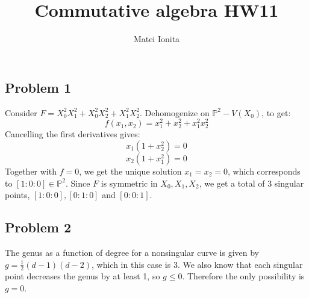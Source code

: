 \documentclass[12 pt]{article}
\title{Commutative algebra HW11}
\author{Matei Ionita}
\newcommand{\Proj}{\mathbb{P}}
\begin{document}
  \maketitle

\subsection*{Problem 1}
Consider $F = X_0^2 X_1^2 + X_0^2 X_2^2 + X_1^2 X_2^2$. Dehomogenize on $\Proj^2 - V(X_0)$, to get:
\[         f(x_1, x_2) = x_1^2 + x_2^2 + x_1^2 x_2^2      \]
Cancelling the first derivatives gives:
\[     x_1 (1 + x_2^2) = 0      \]
\[     x_2 (1 + x_1^2) = 0              \]
Together with $f = 0$, we get the unique solution $x_1 = x_2 = 0$, which corresponds to $[1:0:0] \in \Proj^2$. Since $F$ is symmetric in $X_0, X_1, X_2$, we get a total of 3 singular points, $[1:0:0], [0:1:0]$ and $[0:0:1]$.

\subsection*{Problem 2}
The genus as a function of degree for a nonsingular curve is given by $g = \frac{1}{2}(d-1)(d-2)$, which in this case is 3. We also know that each singular point decreases the genus by at least 1, so $g\leq 0$. Therefore the only possibility is $g=0$.
\end{document}
